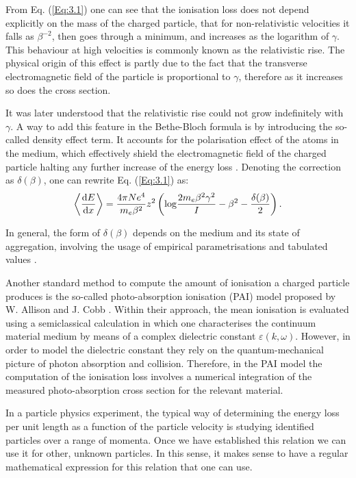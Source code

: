 From Eq. (\ref{Eq:3.1}) one can see that the ionisation loss does not depend explicitly on the mass of the charged particle, that for non-relativistic velocities it falls as $\beta^{-2}$, then goes through a minimum, and increases as the logarithm of $\gamma$. This behaviour at high velocities is commonly known as the relativistic rise. The physical origin of this effect is partly due to the fact that the transverse electromagnetic field of the particle is proportional to $\gamma$, therefore as it increases so does the cross section.

It was later understood that the relativistic rise could not grow indefinitely with $\gamma$. A way to add this feature in the Bethe-Bloch formula is by introducing the so-called density effect term. It accounts for the polarisation effect of the atoms in the medium, which effectively shield the electromagnetic field of the charged particle halting any further increase of the energy loss \cite{Fermi1940}. Denoting the correction as $\delta(\beta)$, one can rewrite Eq. (\ref{Eq:3.1}) as:
\begin{equation}\label{Eq:3.2}
    \expval{\frac{\mathrm{d}E}{\mathrm{d}x}} = \frac{4 \pi N e^{4}}{m_{e}\beta^{2}} z^{2} \left(\mathrm{log} \frac{2m_{e}\beta^{2}\gamma^{2}}{I} - \beta^{2}-\frac{\delta(\beta)}{2}\right).
\end{equation}

In general, the form of $\delta(\beta)$ depends on the medium and its state of aggregation, involving the usage of empirical parametrisations and tabulated values \cite{Sternheimer1984}.

Another standard method to compute the amount of ionisation a charged particle produces is the so-called photo-absorption ionisation (PAI) model proposed by W. Allison and J. Cobb \cite{Allison1980}. Within their approach, the mean ionisation is evaluated using a semiclassical calculation in which one characterises the continuum material medium by means of a complex dielectric constant $\varepsilon(k, \omega)$. However, in order to model the dielectric constant they rely on the quantum-mechanical picture of photon absorption and collision. Therefore, in the PAI model the computation of the ionisation loss involves a numerical integration of the measured photo-absorption cross section for the relevant material.

In a particle physics experiment, the typical way of determining the energy loss per unit length as a function of the particle velocity is studying identified particles over a range of momenta. Once we have established this relation we can use it for other, unknown particles. In this sense, it makes sense to have a regular mathematical expression for this relation that one can use.

